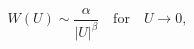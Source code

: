 \begin{equation}
W(U) \sim \frac{\alpha }{|U|^\beta }\quad \mathrm{for}\quad U \rightarrow 0, 
\end{equation}


